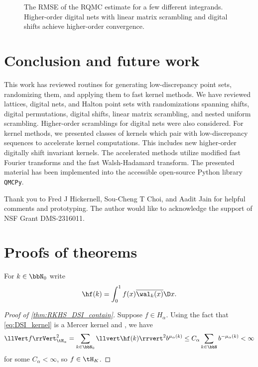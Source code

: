 \documentclass[acmsmall]{acmart}
\begin{document}
\begin{figure}%
    \centering
    \caption{The RMSE of the RQMC estimate for a few different integrands. Higher-order digital nets with linear matrix scrambling and digital shifts achieve higher-order convergence.}
    \Description[]{}
    \label{fig:convergence}
\end{figure}

\section{Conclusion and future work} \label{sec:conclusions_future_work}

This work has reviewed routines for generating low-discrepancy point sets, randomizing them, and applying them to fast kernel methods. We have reviewed lattices, digital nets, and Halton point sets with randomizations spanning shifts, digital permutations, digital shifts, linear matrix scrambling, and nested uniform scrambling. Higher-order scramblings for digital nets were also considered. For kernel methods, we presented classes of kernels which pair with low-discrepancy sequences to accelerate kernel computations. This includes new higher-order digitally shift invariant kernels. The accelerated methods utilize modified fast Fourier transforms and the fast Walsh-Hadamard transform. The presented material has been implemented into the accessible open-source Python library \texttt{QMCPy}.  

\begin{acks}
    Thank you to Fred J Hickernell, Sou-Cheng T Choi, and Aadit Jain for helpful comments and prototyping. The author would like to acknowledge the support of NSF Grant DMS-2316011.
\end{acks}

%




\appendix 

\section{Proofs of theorems} \label{appendix:proofs}

For $k \in \bbN_0$ write
$$\hf(k) = \int_0^1 f(x) \overline{\wal_k(x)} \D x.$$

\begin{proof}[Proof of \cref{thm:RKHS_DSI_contain}] 
    Suppose $f \in H_\alpha$. Using the fact that \eqref{eq:DSI_kernel} is a Mercer kernel and \citep[Theorem 14, Remark 19]{dick.decay_walsh_coefficients_smooth_functions}, we have 
    $$\llVert f \rrVert_{\tH_\alpha}^2 = \sum_{k \in \bbN_0} \llvert \hf(k) \rrvert^2 b^{\mu_\alpha(k)} \leq C_\alpha \sum_{k \in \bbN} b^{-\mu_\alpha(k)} < \infty$$ 
    for some $C_\alpha < \infty$, so $f \in \tH_K$.
\end{proof}
\end{document}
